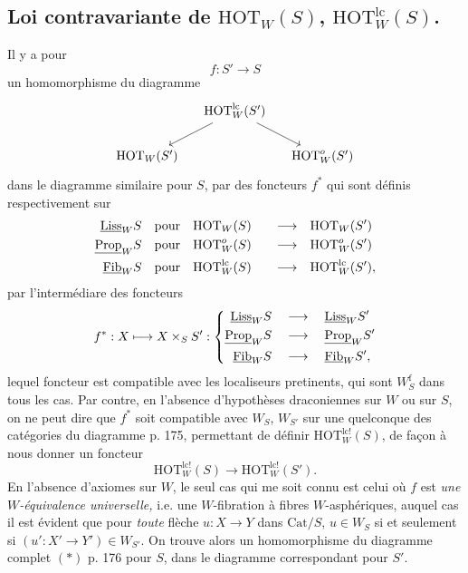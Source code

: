 \subsection*{ Loi contravariante de $\mathrm{HOT}_W(S)$, $\mathrm{HOT}^{\mathrm{lc}}_W(S)$.}

Il y a pour
\[
f : S' \longrightarrow S
\]
un homomorphisme du diagramme
\[
\begin{tikzcd}[column sep=small]
& \mathrm{HOT}^{\mathrm{lc}}_W(S') \arrow[dl] \arrow[dr] & \\
\mathrm{HOT}_W(S') & & \mathrm{HOT}^{o}_W(S')
\end{tikzcd}
\]
dans le diagramme similaire pour $S$, par des foncteurs $f^*$ qui sont définis respectivement sur
\[
\begin{aligned}
\underline{\mathrm{Liss}}_W S &\quad \text{pour}\quad \mathrm{HOT}_W(S) & \quad\longrightarrow\quad & \mathrm{HOT}_W(S')\\
\underline{\mathrm{Prop}}_W S &\quad \text{pour}\quad \mathrm{HOT}^{o}_W(S) & \quad\longrightarrow\quad & \mathrm{HOT}^{o}_W(S')\\
\underline{\mathrm{Fib}}_W S &\quad \text{pour}\quad \mathrm{HOT}^{\mathrm{lc}}_W(S) & \quad\longrightarrow\quad & \mathrm{HOT}^{\mathrm{lc}}_W(S'),
\end{aligned}
\]
par l'intermédiare des foncteurs %
\[
f^* : X \longmapsto X \times_S S' : \left\{
\begin{aligned}
\underline{\mathrm{Liss}}_W S &\quad\longrightarrow\quad \underline{\mathrm{Liss}}_W S'\\
\underline{\mathrm{Prop}}_W S &\quad\longrightarrow\quad \underline{\mathrm{Prop}}_W S'\\
\underline{\mathrm{Fib}}_W S &\quad\longrightarrow\quad \underline{\mathrm{Fib}}_W S',
\end{aligned}
\right.
\]
lequel foncteur est compatible avec les localiseurs pretinents, qui sont $W_S^{\mathrm{f}}$ dans tous les cas. Par contre, en l'absence d'hypothèses draconiennes sur $W$ ou sur $S$, on ne peut dire que $f^*$ soit compatible avec $W_S$, $W_{S'}$ sur une quelconque des catégories du diagramme p. 175, permettant de définir $\mathrm{HOT}^{\mathrm{lc!}}_W(S)$, de façon à nous donner un foncteur %
\[
\mathrm{HOT}^{\mathrm{lc!}}_W(S) \longrightarrow \mathrm{HOT}^{\mathrm{lc!}}_W(S').
\]
En l'absence d'axiomes sur $W$, le seul cas qui me soit connu est celui où $f$ est \textit{une $W$-équivalence universelle,} i.e. une $W$-fibration à fibres $W$-asphériques, auquel cas il est évident que pour \textit{toute} flèche $u : X \longrightarrow Y$ dans $\mathrm{Cat}/S$, $u \in W_S$ si et seulement si $(u' : X' \longrightarrow Y') \in W_{S'}$. On trouve alors un homomorphisme du diagramme complet $(*)$ p. 176 pour $S$, dans le diagramme correspondant pour $S'$.

